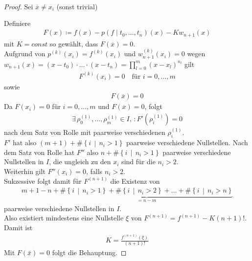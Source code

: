 \begin{proof}
  Sei $\overline{x}\neq x_i$ (sonst trivial)
  \label{im6.1.18}


  Definiere
  \begin{gather}
    F(x) \coloneqq f(x)-p(f\mid  t_0,\dots , t_n)(x) - Kw_{n+1}(x)
    \label{VI.1.22}
  \end{gather}
  mit $K=const$ so gewählt, dass $F(\overline{x})=0$.\\
  Aufgrund von $p^{(k)}(x_i)=f^{(k)}(x_i)$
  und $w_{n+1}^{(k)}(x_i) = 0$ wegen
  $w_{n+1}(x) =
  (x-t_0)\cdot\dots\cdot(x-t_n)=\prod_{l=0}^{m}(x-x_l)^{n_l}$
  gilt
  \begin{gather*}
    F^{(k)}(x_i) = 0 
    \quad \text{für } i=0,\dots,m 
  \end{gather*}
  sowie
  \begin{gather*}
    F(\overline{x})=0
  \end{gather*}
  Da $F(x_i)=0$ für $i=0,\dots,m$ und $F(\overline{x})=0$, folgt
  \begin{gather*}
    \exists\, \rho_0^{(1)},\dots,\rho_m^{(1)}\in I,\,
    : F'(\rho_i^{(1)})=0
  \end{gather*}
  nach dem Satz von Rolle 
  mit paarweise verschiedenen $\rho_i^{(1)}$. \\
  $F'$ hat also $(m+1)+\#\left\{i\,\middle\vert\, n_i>1\right\}$
  paarweise verschiedene Nullstellen.
  Nach dem Satz von Rolle hat $F''$ also 
  $n+\#\left\{i\,\middle\vert\, n_i>1\right\}$
  paarweise verschiedene Nullstellen in $I$,
  die ungleich zu den $x_i$ sind für die $n_i>2$.\\
  Weiterhin gilt $F''(x_i)=0$, falls $n_i>2$.\\
  Sukzessive folgt damit für $F^{(n+1)}$ die Existenz von
  \begin{gather*}
    m+1-n + \underbrace{
      \#\left\{i\,\middle\vert\, n_i>1\right\}
      + \#\left\{i\,\middle\vert\, n_i>2\right\}
      + \dots 
      + \#\left\{i\,\middle\vert\, n_i>n\right\}
    }_{=n-m}
  \end{gather*}
  paarweise verschiedene Nullstellen in $I$.\\
  Also existiert mindestens eine Nullstelle $\xi$ von
  $F^{(n+1)}=f^{(n+1)}-K(n+1)!$. Damit ist
  \begin{gather*}
    K=\frac{f^{(n+1)}(\xi)}{(n+1)!}
  \end{gather*}
  Mit $F(\overline{x}) =0$ folgt die Behauptung.
\end{proof}



